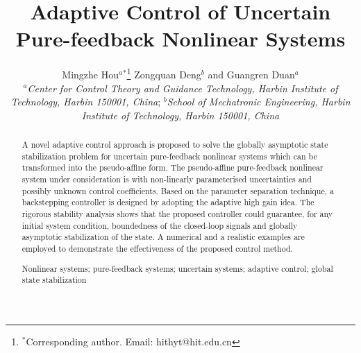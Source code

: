 \documentclass{tSYS2e}
\theoremstyle{plain}
\theoremstyle{definition}
\begin{document}
\title{Adaptive Control of Uncertain Pure-feedback Nonlinear Systems}

\author{Mingzhe Hou$^{a}$$^{\ast}$\thanks{$^\ast$Corresponding author. Email: hithyt@hit.edu.cn
\vspace{6pt}} Zongquan Deng$^{b}$ and Guangren Duan$^{a}$ \\\vspace{6pt} $^{a}${\em{Center for Control Theory and Guidance Technology, Harbin
Institute of Technology, Harbin 150001, China}};
$^{b}${\em{School of Mechatronic Engineering, Harbin
Institute of Technology, Harbin 150001, China}}\\ }

\maketitle

\begin{abstract}
A novel adaptive control approach is proposed to solve the globally asymptotic state stabilization problem
for uncertain pure-feedback nonlinear systems which can be transformed into the pseudo-affine form.
The pseudo-affine pure-feedback nonlinear system under consideration is with non-linearly parameterised uncertainties
and possibly unknown control coefficients. Based on the parameter separation technique, a backstepping controller is designed by adopting the adaptive high gain idea. The rigorous stability analysis shows that the proposed controller could guarantee, for any initial system condition,
boundedness of the closed-loop signals and globally asymptotic stabilization of the state.
A numerical and a realistic examples are employed to demonstrate the effectiveness of the proposed control method.

\begin{keywords}Nonlinear systems; pure-feedback systems; uncertain
systems; adaptive control; global state stabilization
\end{keywords}

\end{abstract}
\end{document}
